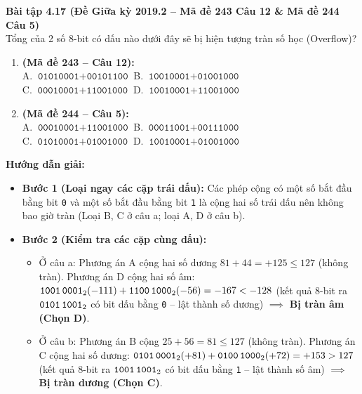\textbf{Bài tập 4.17 (Đề Giữa kỳ 2019.2 -- Mã đề 243 Câu 12 \& Mã đề 244 Câu 5)}\\
Tổng của 2 số 8-bit có dấu nào dưới đây sẽ bị hiện tượng tràn số học (Overflow)?
\begin{enumerate}[label=\alph*)]
    \item \textbf{(Mã đề 243 -- Câu 12):}\\
    A. $\texttt{01010001} + \texttt{00101100}$ \qquad B. $\texttt{10010001} + \texttt{01001000}$\\
    C. $\texttt{00010001} + \texttt{11001000}$ \qquad D. $\texttt{10010001} + \texttt{11001000}$
    \item \textbf{(Mã đề 244 -- Câu 5):}\\
    A. $\texttt{00010001} + \texttt{11001000}$ \qquad B. $\texttt{00011001} + \texttt{00111000}$\\
    C. $\texttt{01010001} + \texttt{01001000}$ \qquad D. $\texttt{10010001} + \texttt{01001000}$
\end{enumerate}
\textbf{Hướng dẫn giải:}
\begin{itemize}
    \item \textbf{Bước 1 (Loại ngay các cặp trái dấu):} Các phép cộng có một số bắt đầu bằng bit \texttt{0} và một số bắt đầu bằng bit \texttt{1} là cộng hai số trái dấu nên không bao giờ tràn (Loại B, C ở câu a; loại A, D ở câu b).
    \item \textbf{Bước 2 (Kiểm tra các cặp cùng dấu):}
    \begin{itemize}
        \item Ở câu a: Phương án A cộng hai số dương $81 + 44 = +125 \le 127$ (không tràn). Phương án D cộng hai số âm: $\texttt{1001\,0001}_2 (-111) + \texttt{1100\,1000}_2 (-56) = -167 < -128$ (kết quả 8-bit ra $\texttt{0101\,1001}_2$ có bit dấu bằng \texttt{0} -- lật thành số dương) $\implies$ \textbf{Bị tràn âm (Chọn D)}.
        \item Ở câu b: Phương án B cộng $25 + 56 = 81 \le 127$ (không tràn). Phương án C cộng hai số dương: $\texttt{0101\,0001}_2 (+81) + \texttt{0100\,1000}_2 (+72) = +153 > 127$ (kết quả 8-bit ra $\texttt{1001\,1001}_2$ có bit dấu bằng \texttt{1} -- lật thành số âm) $\implies$ \textbf{Bị tràn dương (Chọn C)}.
    \end{itemize}
\end{itemize}

